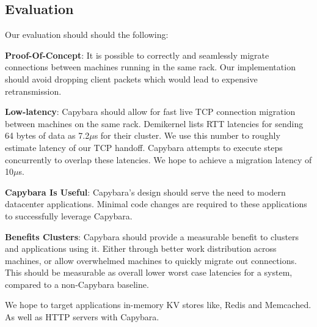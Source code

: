 \subsection{Evaluation}
Our evaluation should should the following:
\begin{compactitem}
    \item \textbf{Proof-Of-Concept}: It is possible to correctly and seamlessly migrate connections between machines running in the same rack. Our implementation should avoid dropping client packets which would lead to expensive retransmission. 
    \item \textbf{Low-latency}: Capybara should allow for fast live TCP connection migration between machines on the same rack. Demikernel lists RTT latencies for sending 64 bytes of data as 7.2$\mu{}$s for their cluster. We use this number to roughly estimate latency of our TCP handoff. Capybara attempts to execute steps concurrently to overlap these latencies. We hope to achieve a migration latency of 10$\mu{}$s.
    \item \textbf{Capybara Is Useful}: Capybara's design should serve the need to modern datacenter applications. Minimal code changes are required to these applications to successfully leverage Capybara.
    \item \textbf{Benefits Clusters}: Capybara should provide a measurable benefit to clusters and applications using it. Either through better work distribution across machines, or allow overwhelmed machines to quickly migrate out connections. This should be measurable as overall lower worst case latencies for a system, compared to a non-Capybara baseline.
\end{compactitem}
We hope to target applications in-memory KV stores like, Redis and Memcached. As well as HTTP servers with Capybara.